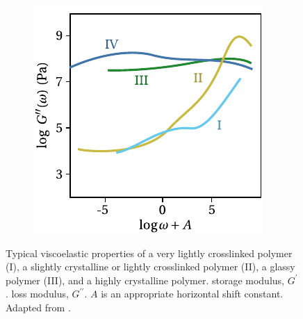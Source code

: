 \begin{figure}[hbtp]
\begin{subfigure}[b]{0.45\textwidth}
                        \includegraphics[width=\textwidth]{figures/loss_modulus_scp}
                        \caption{}
                        \label{subfig:loss_modulus_scp}
        \end{subfigure}
    \caption{Typical viscoelastic properties of a very lightly crosslinked polymer (I), a slightly crystalline or lightly crosslinked polymer (II), a glassy polymer (III), and a highly crystalline polymer.  storage modulus, $G^\prime$.  loss modulus, $G^{\prime\prime}$. $A$ is an appropriate horizontal shift constant. Adapted from \cite{ferryViscoelasticPropertiesPolymers1980}.}
\label{fig:dma_scp}
\end{figure}

